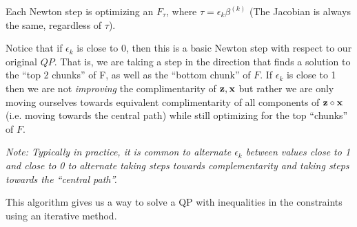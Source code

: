 Each Newton step is optimizing an $F_\tau$, where 
$\tau = \epsilon_k\beta^{(k)}$ (The Jacobian is always the same, regardless of
$\tau$). 

Notice that if $\epsilon_k$ is close to 0, then this 
is a basic Newton step with respect to our original $QP$. That is, we are taking
a step in the direction that finds a solution to the ``top 2 chunks'' of F, as
well as the ``bottom chunk'' of $F$.
If $\epsilon_k$ is close to 1 then we are not \textit{improving} the complimentarity of 
$\mathbf{z}, \mathbf{x}$ but rather we are only moving ourselves towards equivalent 
complimentarity of all components of $\mathbf{z} \circ \mathbf{x}$ 
(i.e. moving towards the central path)
while still optimizing for
the top ``chunks'' of $F$.

\textit{Note: Typically in practice, it is common to alternate $\epsilon_k$ between values close
to 1 and close to 0 to alternate taking steps towards complementarity and taking
steps towards the ``central path''. }

This algorithm gives us a way to solve a QP with inequalities in the constraints
using an iterative method.
